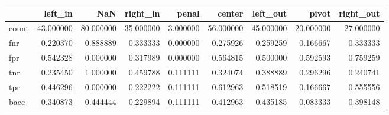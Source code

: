 \begin{tabular}{lrrrrrrrr}
\toprule
{} &    left\_in &        NaN &   right\_in &     penal &     center &   left\_out &      pivot &  right\_out \\
\midrule
count &  43.000000 &  80.000000 &  35.000000 &  3.000000 &  56.000000 &  45.000000 &  20.000000 &  27.000000 \\
fnr   &   0.220370 &   0.888889 &   0.333333 &  0.000000 &   0.275926 &   0.259259 &   0.166667 &   0.333333 \\
fpr   &   0.542328 &   0.000000 &   0.317989 &  0.000000 &   0.564815 &   0.500000 &   0.592593 &   0.759259 \\
tnr   &   0.235450 &   1.000000 &   0.459788 &  0.111111 &   0.324074 &   0.388889 &   0.296296 &   0.240741 \\
tpr   &   0.446296 &   0.000000 &   0.222222 &  0.111111 &   0.612963 &   0.518519 &   0.166667 &   0.555556 \\
bacc  &   0.340873 &   0.444444 &   0.229894 &  0.111111 &   0.412963 &   0.435185 &   0.083333 &   0.398148 \\
\bottomrule
\end{tabular}
